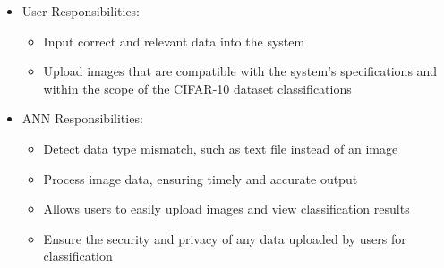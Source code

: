 \documentclass[12pt]{article}
\begin{document}

\begin{itemize}
\item User Responsibilities:
\begin{itemize}
\item Input correct and relevant data into the system
\item Upload images that are compatible with the system's specifications 
and within the scope of the CIFAR-10 dataset \cite{CIFAR} classifications
\end{itemize}
\item ANN Responsibilities:
\begin{itemize}
\item Detect data type mismatch, such as text file instead of an image
\item Process image data, ensuring timely and accurate output
\item Allows users to easily upload images and view classification results
\item Ensure the security and privacy of any data uploaded by users for classification
\end{itemize}
\end{itemize}

\end{document}
